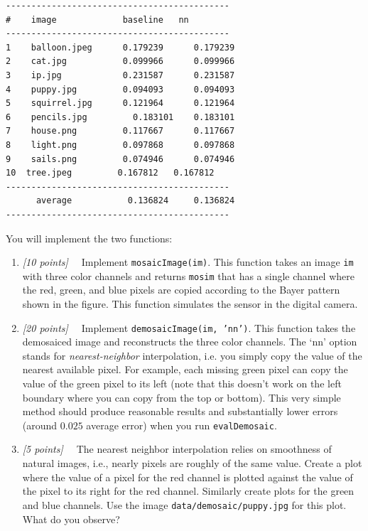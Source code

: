 \documentclass[10pt,letterpaper]{article}
\newcommand{\cmd}[1] {{\color{blue}\texttt{#1}}}
\newcommand{\points}[1]{{\color{mygreen}\emph{[#1]\ \ }}}
\begin{document}
\begin{verbatim}
--------------------------------------------
# 	 image             baseline   nn
--------------------------------------------
1 	 balloon.jpeg      0.179239 	 0.179239 
2 	 cat.jpg           0.099966 	 0.099966 
3 	 ip.jpg            0.231587 	 0.231587 
4 	 puppy.jpg         0.094093 	 0.094093 
5 	 squirrel.jpg      0.121964 	 0.121964 
6 	 pencils.jpg 	     0.183101 	 0.183101 
7 	 house.png         0.117667 	 0.117667 
8 	 light.png         0.097868 	 0.097868 
9 	 sails.png         0.074946 	 0.074946 
10  tree.jpeg         0.167812 	 0.167812 
--------------------------------------------
 	  average           0.136824 	 0.136824 
--------------------------------------------
\end{verbatim}
You will implement the two functions:
\begin{enumerate}
\item \points{10 points} Implement \cmd{mosaicImage(im)}. This function takes an image \cmd{im} with three color channels and returns \cmd{mosim} that has a single channel where the red, green, and blue pixels are copied according to the Bayer pattern shown in the figure. This function simulates the sensor in the digital camera.

\item \points{20 points} Implement \cmd{demosaicImage(im, 'nn')}. This function takes the demosaiced image and reconstructs the three color channels. The `nn' option stands for \emph{nearest-neighbor} interpolation, i.e. you simply copy the value of the nearest available pixel. For example, each missing green pixel can copy the value  of the green pixel to its left (note that this doesn't work on the left boundary where you can copy from the top or bottom). This very simple method should produce reasonable results and substantially lower errors (around $0.025$ average error) when you run \cmd{evalDemosaic}.

\item \points{5 points} The nearest neighbor interpolation relies on smoothness of natural images, i.e., nearly pixels are roughly of the same value. Create a plot where the value of a pixel for the red channel is plotted against the value of the pixel to its right for the red channel. Similarly create plots for the green and blue channels. 
Use the image \cmd{data/demosaic/puppy.jpg} for this plot. What do you observe?




\end{enumerate}
\end{document}
